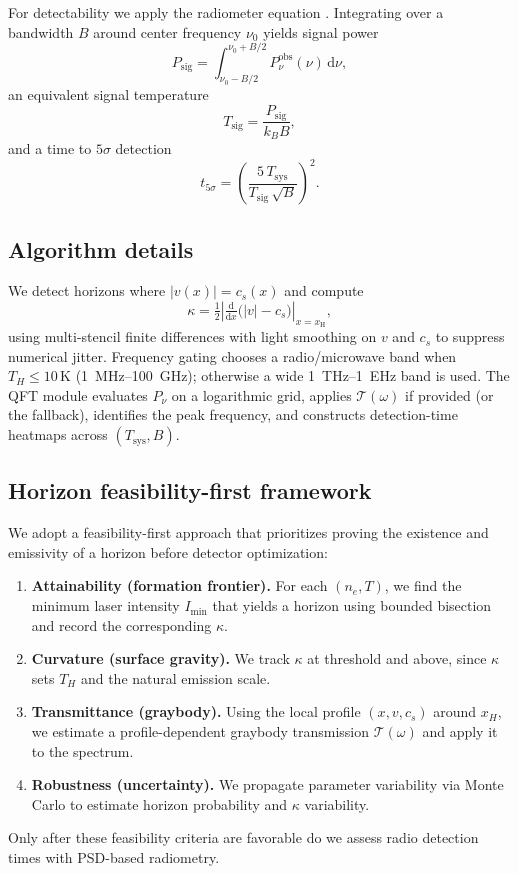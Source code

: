 \documentclass[11pt]{article}
\begin{document}
For detectability we apply the radiometer equation \cite{Wilson2013}. Integrating over a bandwidth $B$ around center frequency $\nu_0$ yields signal power
\begin{equation}
  P_{\mathrm{sig}} = \int_{\nu_0 - B/2}^{\nu_0 + B/2} P^{\mathrm{obs}}_{\nu}(\nu)\,\mathrm{d}\nu,
\end{equation}
an equivalent signal temperature
\begin{equation}
  T_{\mathrm{sig}} = \frac{P_{\mathrm{sig}}}{k_B B},
\end{equation}
and a time to $5\sigma$ detection
\begin{equation}
  t_{5\sigma} = \left( \frac{5\, T_{\mathrm{sys}}}{T_{\mathrm{sig}}\,\sqrt{B}} \right)^2.
\end{equation}

\subsection{Algorithm details}
We detect horizons where $|v(x)| = c_s(x)$ and compute
\begin{equation}
  \kappa = \tfrac{1}{2} \left|\tfrac{\mathrm{d}}{\mathrm{d}x}\big(|v| - c_s\big)\right|_{x=x_\mathrm{H}},
\end{equation}
using multi-stencil finite differences with light smoothing on $v$ and $c_s$ to suppress numerical jitter. Frequency gating chooses a radio/microwave band when $T_H\!\le\!10\,$K (\SI{1}{MHz}--\SI{100}{GHz}); otherwise a wide \SI{1}{THz}--\SI{1}{EHz} band is used. The QFT module evaluates $P_{\nu}$ on a logarithmic grid, applies $\mathcal{T}(\omega)$ if provided (or the fallback), identifies the peak frequency, and constructs detection-time heatmaps across $(T_{\mathrm{sys}}, B)$.

\subsection{Horizon feasibility-first framework}
We adopt a feasibility-first approach that prioritizes proving the existence and emissivity of a horizon before detector optimization:
\begin{enumerate}
  \item \textbf{Attainability (formation frontier).} For each $(n_e, T)$, we find the minimum laser intensity $I_{\min}$ that yields a horizon using bounded bisection and record the corresponding $\kappa$.
  \item \textbf{Curvature (surface gravity).} We track $\kappa$ at threshold and above, since $\kappa$ sets $T_H$ and the natural emission scale.
  \item \textbf{Transmittance (graybody).} Using the local profile $(x, v, c_s)$ around $x_H$, we estimate a profile-dependent graybody transmission $\mathcal{T}(\omega)$ and apply it to the spectrum.
  \item \textbf{Robustness (uncertainty).} We propagate parameter variability via Monte Carlo to estimate horizon probability and $\kappa$ variability.
\end{enumerate}
Only after these feasibility criteria are favorable do we assess radio detection times with PSD-based radiometry.
\end{document}
